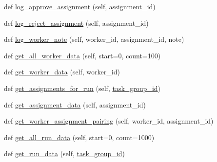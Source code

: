 \begin{DoxyCompactItemize}
def \hyperlink{classparlai_1_1mturk_1_1core_1_1legacy__2018_1_1mturk__data__handler_1_1MTurkDataHandler_ae56cf103d88b3fda36a51ffc0534c184}{log\+\_\+approve\+\_\+assignment} (self, assignment\+\_\+id)
\item 
def \hyperlink{classparlai_1_1mturk_1_1core_1_1legacy__2018_1_1mturk__data__handler_1_1MTurkDataHandler_ac2e8b6d462a8ce16509ac25fff7f8c24}{log\+\_\+reject\+\_\+assignment} (self, assignment\+\_\+id)
\item 
def \hyperlink{classparlai_1_1mturk_1_1core_1_1legacy__2018_1_1mturk__data__handler_1_1MTurkDataHandler_a41f11b100a6afe3b51496882d0df7c58}{log\+\_\+worker\+\_\+note} (self, worker\+\_\+id, assignment\+\_\+id, note)
\item 
def \hyperlink{classparlai_1_1mturk_1_1core_1_1legacy__2018_1_1mturk__data__handler_1_1MTurkDataHandler_a3b340b130896aab223069d783566ce3e}{get\+\_\+all\+\_\+worker\+\_\+data} (self, start=0, count=100)
\item 
def \hyperlink{classparlai_1_1mturk_1_1core_1_1legacy__2018_1_1mturk__data__handler_1_1MTurkDataHandler_aaaee48085add1dcdca33b9e3c41c3444}{get\+\_\+worker\+\_\+data} (self, worker\+\_\+id)
\item 
def \hyperlink{classparlai_1_1mturk_1_1core_1_1legacy__2018_1_1mturk__data__handler_1_1MTurkDataHandler_a4a1d5f9b4aed51ba98d4979317ef9329}{get\+\_\+assignments\+\_\+for\+\_\+run} (self, \hyperlink{classparlai_1_1mturk_1_1core_1_1legacy__2018_1_1mturk__data__handler_1_1MTurkDataHandler_ab743471dc641c785f93d9c1285967162}{task\+\_\+group\+\_\+id})
\item 
def \hyperlink{classparlai_1_1mturk_1_1core_1_1legacy__2018_1_1mturk__data__handler_1_1MTurkDataHandler_a31d6cd2577202bf2e6e4984a02f14f2a}{get\+\_\+assignment\+\_\+data} (self, assignment\+\_\+id)
\item 
def \hyperlink{classparlai_1_1mturk_1_1core_1_1legacy__2018_1_1mturk__data__handler_1_1MTurkDataHandler_a8478ff4b3117b30f5528ae7bb6533e51}{get\+\_\+worker\+\_\+assignment\+\_\+pairing} (self, worker\+\_\+id, assignment\+\_\+id)
\item 
def \hyperlink{classparlai_1_1mturk_1_1core_1_1legacy__2018_1_1mturk__data__handler_1_1MTurkDataHandler_a73a79c0e3a769cdc1803e2c44ea47d65}{get\+\_\+all\+\_\+run\+\_\+data} (self, start=0, count=1000)
\item 
def \hyperlink{classparlai_1_1mturk_1_1core_1_1legacy__2018_1_1mturk__data__handler_1_1MTurkDataHandler_a9f03e4f7a133dfa1d22df886a303d339}{get\+\_\+run\+\_\+data} (self, \hyperlink{classparlai_1_1mturk_1_1core_1_1legacy__2018_1_1mturk__data__handler_1_1MTurkDataHandler_ab743471dc641c785f93d9c1285967162}{task\+\_\+group\+\_\+id})

\end{DoxyCompactItemize}
